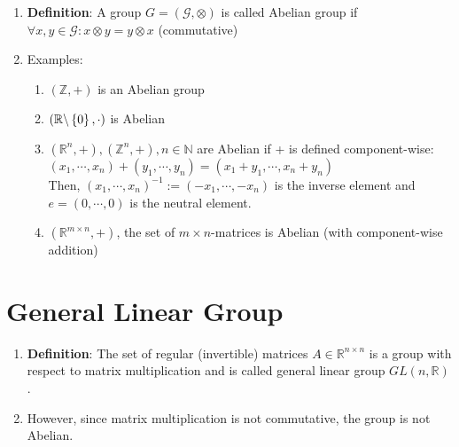 \begin{enumerate}
    \item \textbf{Definition}: A group $G = (\mathcal{G}, \otimes)$ is called Abelian group if $\forall x, y \in \mathcal{G} : x \otimes y = y \otimes x$ (commutative)
    \hfill \cite{mfml/book/mml/Deisenroth-Faisal-Ong}

    \item Examples:
    \begin{enumerate}
        \item $(\mathbb{Z}, +)$ is an Abelian group
        \hfill \cite{mfml/book/mml/Deisenroth-Faisal-Ong}

        \item $( \mathbb{R} \backslash \left\{0\right\}, \cdot)$ is Abelian
        \hfill \cite{mfml/book/mml/Deisenroth-Faisal-Ong}

        \item $(\mathbb{R}^n, +),(\mathbb{Z}^n, +), n \in \mathbb{N}$ are Abelian if + is defined component-wise:
        \\
        $
            (x_1, \cdots , x_n) + (y_1, \cdots , y_n) = (x_1 + y_1, \cdots , x_n + y_n)
        $
        \\
        Then, $(x_1, \cdots , x_n)^{-1} := (-x_1, \cdots , -x_n)$ is the inverse element and $e = (0, \cdots , 0)$ is the neutral element.

        \item $(\mathbb{R}^{m\times n} , +)$, the set of $m \times n$-matrices is Abelian  (with component-wise addition)

        
    \end{enumerate}
\end{enumerate}





\section{General Linear Group}

\begin{enumerate}
    \item \textbf{Definition}: The set of regular (invertible) matrices $A \in \mathbb{R}^{n\times n}$ is a group with respect to matrix multiplication and is called general linear group $GL(n, \mathbb{R})$. 
    
    \item However, since matrix multiplication is not commutative, the group is not Abelian.

    
\end{enumerate}






